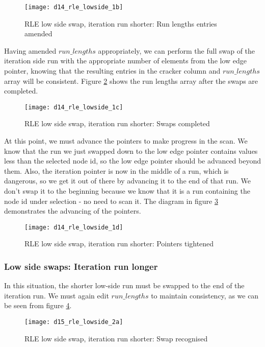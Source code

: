 \begin{figure}[H]
  \centering
  \texttt{[image: d14\_rle\_lowside\_1b]}
  \caption{RLE low side swap, iteration run shorter: Run lengths entries amended}
  \label{fig:rle_lowside_1b}
\end{figure}

Having amended $run\_lengths$ appropriately, we can perform the full swap of the iteration side run with the appropriate number of elements from the low edge pointer, knowing that the resulting entries in the cracker column and $run\_lengths$ array will be consistent. Figure \ref{fig:rle_lowside_1c} shows the run lengths array after the swaps are completed.

\begin{figure}[H]
  \centering
  \texttt{[image: d14\_rle\_lowside\_1c]}
  \caption{RLE low side swap, iteration run shorter: Swaps completed}
  \label{fig:rle_lowside_1c}
\end{figure}

At this point, we must advance the pointers to make progress in the scan. We know that the run we just swapped down to the low edge pointer contains values less than the selected node id, so the low edge pointer should be advanced beyond them. Also, the iteration pointer is now in the middle of a run, which is dangerous, so we get it out of there by advancing it to the end of that run. We don't swap it to the beginning because we know that it is a run containing the node id under selection - no need to scan it. The diagram in figure \ref{fig:rle_lowside_1d} demonstrates the advancing of the pointers.

\begin{figure}[H]
  \centering
  \texttt{[image: d14\_rle\_lowside\_1d]}
  \caption{RLE low side swap, iteration run shorter: Pointers tightened}
  \label{fig:rle_lowside_1d}
\end{figure}

\subsubsection{Low side swaps: Iteration run longer}

In this situation, the shorter low-side run must be swapped to the end of the iteration run. We must again edit $run\_lengths$ to maintain consistency, as we can be seen from figure \ref{fig:rle_lowside_2a}.

\begin{figure}[H]
  \centering
  \texttt{[image: d15\_rle\_lowside\_2a]}
  \caption{RLE low side swap, iteration run shorter: Swap recognised}
  \label{fig:rle_lowside_2a}
\end{figure}

